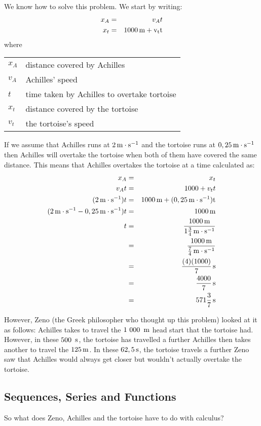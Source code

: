 We know how to solve this problem. We start by writing:
\begin{eqnarray}
x_A&=&v_A t\\
x_t&=&1000\,\rm{m}+v_t t
\end{eqnarray}
where
\begin{center}
\begin{tabular}{ll}
$x_A$&distance covered by Achilles\\
$v_A$&Achilles' speed\\
$t$&time taken by Achilles to overtake tortoise\\
$x_t$&distance covered by the tortoise\\
$v_t$&the tortoise's speed\\
\end{tabular}
\end{center}
If we assume that Achilles runs at $2\,\mathrm{m \cdot s^{-1}}$ and the tortoise runs at $0,25\,\mathrm{m \cdot s^{-1}}$ then Achilles will overtake the tortoise when both of them have covered the same distance. This means that Achilles overtakes the tortoise at a time calculated as:
\begin{eqnarray}
x_A&=&x_t\\
v_A t&=&1000+v_t t\\
(2\,\mathrm{m \cdot s^{-1}})t&=&1000\,\rm{m}+(0,25\,\mathrm{m \cdot s^{-1}})t\\
(2\,\mathrm{m \cdot s^{-1}}-0,25\,\mathrm{m \cdot s^{-1}})t&=&1000\,\rm{m}\\
t&=&\frac{1000\,\rm{m}}{1\frac{3}{4}\,\mathrm{m \cdot s^{-1}}}\\
&=&\frac{1000\,\rm{m}}{\frac{7}{4}\,\mathrm{m \cdot s^{-1}}}\\
&=&\frac{(4)(1000)}{7}\,\mathrm{s}\\
&=&\frac{4000}{7}\,\mathrm{s}\\
&=&571\frac{3}{7}\,\mathrm{s}
\end{eqnarray}

However, Zeno (the Greek philosopher who thought up this problem) looked at it as follows:
Achilles takes
to travel the $1~000~\,\rm{m}$ head start that the tortoise had. However, in these $500~\,\mathrm{s}$, the tortoise has travelled a further
Achilles then takes another
to travel the $125\,\rm{m}$. In these $62,5\,\mathrm{s}$, the tortoise travels a further
Zeno saw that Achilles would always get closer but wouldn't actually overtake the tortoise. 

\subsection{Sequences, Series and Functions}
So what does Zeno, Achilles and the tortoise have to do with calculus?


